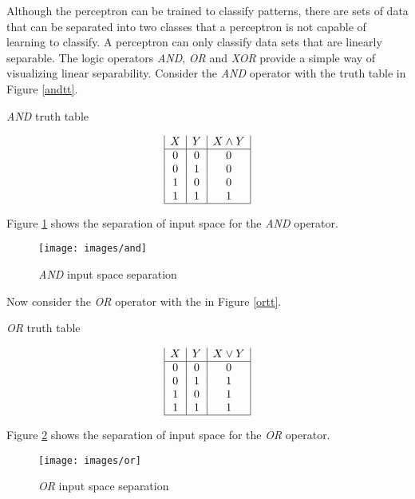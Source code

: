 Although the perceptron can be trained to classify patterns, there are sets of data that can be separated into two classes that a perceptron is not capable of learning to classify.
A perceptron can only classify data sets that are linearly separable.
The logic operators {\it AND}, {\it OR} and {\it XOR} provide a simple way of visualizing linear separability.
Consider the {\it AND} operator with the truth table in Figure \ref{andtt}.
\begin{table}[h!]
  \caption{{\it AND} truth table}
  \label{andtt}
\begin{displaymath}
\begin{array}{|c|c|c|}
   X
 & Y
 & X \land Y
\\
\hline
0 & 0 & 0\\
0 & 1 & 0\\
1 & 0 & 0\\
1 & 1 & 1\\
\hline
\end{array}
\end{displaymath}
\end{table}

Figure \ref{ands} shows the separation of input space for the {\it AND} operator.

\begin{figure}[h!]
  \centering
  \texttt{[image: images/and]}
  \caption{{\it AND} input space separation}
  \label{ands}
\end{figure}

Now consider the {\it OR} operator with the in Figure \ref{ortt}. 

\begin{table}[h!]
\caption{{\it OR} truth table}
\label{ortt}
\begin{displaymath}
\begin{array}{|c|c|c|}
   X
 & Y
 & X \lor Y
\\
\hline
0 & 0 & 0\\
0 & 1 & 1\\
1 & 0 & 1\\
1 & 1 & 1\\
\hline
\end{array}
\end{displaymath}
\end{table}

Figure \ref{ors} shows the separation of input space for the {\it OR} operator.

\begin{figure}[h!]
  \centering
  \texttt{[image: images/or]}
  \caption{{\it OR} input space separation}
  \label{ors}
\end{figure}

